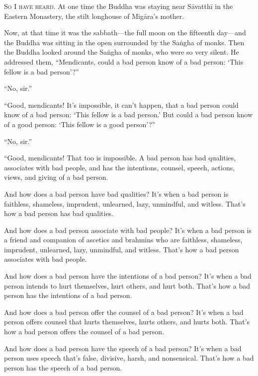 \documentclass[12pt,openany]{book}%
\newcommand*{\scevam}[1]{\textsc{#1}}
\begin{document}
\scevam{So I have heard. }At one time the Buddha was staying near \textsanskrit{Sāvatthī} in the Eastern Monastery, the stilt longhouse of \textsanskrit{Migāra}’s mother. 

Now, at that time it was the sabbath—the full moon on the fifteenth day—and the Buddha was sitting in the open surrounded by the \textsanskrit{Saṅgha} of monks. Then the Buddha looked around the \textsanskrit{Saṅgha} of monks, who were so very silent. He addressed them, “Mendicants, could a bad person know of a bad person: ‘This fellow is a bad person’?” 

“No, sir.” 

“Good, mendicants! It’s impossible, it can’t happen, that a bad person could know of a bad person: ‘This fellow is a bad person.’ But could a bad person know of a good person: ‘This fellow is a good person’?” 

“No, sir.” 

“Good, mendicants! That too is impossible. A bad person has bad qualities, associates with bad people, and has the intentions, counsel, speech, actions, views, and giving of a bad person. 

And how does a bad person have bad qualities? It’s when a bad person is faithless, shameless, imprudent, unlearned, lazy, unmindful, and witless. That’s how a bad person has bad qualities. 

And how does a bad person associate with bad people? It’s when a bad person is a friend and companion of ascetics and brahmins who are faithless, shameless, imprudent, unlearned, lazy, unmindful, and witless. That’s how a bad person associates with bad people. 

And how does a bad person have the intentions of a bad person? It’s when a bad person intends to hurt themselves, hurt others, and hurt both. That’s how a bad person has the intentions of a bad person. 

And how does a bad person offer the counsel of a bad person? It’s when a bad person offers counsel that hurts themselves, hurts others, and hurts both. That’s how a bad person offers the counsel of a bad person. 

And how does a bad person have the speech of a bad person? It’s when a bad person uses speech that’s false, divisive, harsh, and nonsensical. That’s how a bad person has the speech of a bad person. 
\end{document}
